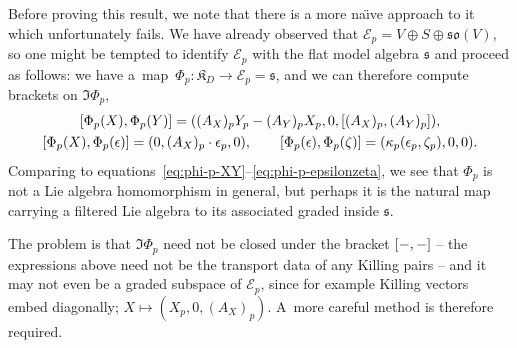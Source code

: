 \documentclass[11pt]{article}
\numberwithin{equation}{section}
\numberwithin{equation}{section}
\newcommand{\fs}{\mathfrak{s}}
\newcommand{\fso}{\mathfrak{so}}
\newcommand{\fK}{\mathfrak{K}}
\newcommand{\eE}{\mathscr{E}}
\newcommand{\1}{\mathbbm{1}}
\begin{document}
\begin{Remark}
Before proving this result, we note that there is a more na\"{\i}ve approach to it which unfortunately fails. We have already observed that $\eE_p = V\oplus S\oplus\fso(V)$, so one might be tempted to identify $\eE_p$ with the flat model algebra $\fs$ and proceed as follows: we have a~map~${\Phi_p\colon \fK_D\to \eE_p=\fs}$, and we can therefore compute brackets on $\Im\Phi_p$,
\begin{gather*}
	\comm{\Phi_p(X)}{\Phi_p(Y)}
		= \qty((A_X)_p Y_p - (A_Y)_p X_p,0,\comm{(A_X)_p}{(A_Y)_p}),\\
	\comm{\Phi_p(X)}{\Phi_p(\epsilon)}
		= \qty(0,(A_X)_p\cdot\epsilon_p,0),\qquad
	\comm{\Phi_p(\epsilon)}{\Phi_p(\zeta)}
		= \qty(\kappa_p(\epsilon_p,\zeta_p),0,0).
\end{gather*}
Comparing to equations~\eqref{eq:phi-p-XY}--\eqref{eq:phi-p-epsilonzeta}, we see that $\Phi_p$ is not a Lie algebra homomorphism in general, but perhaps it is the natural map carrying a filtered Lie algebra to its associated graded inside $\fs$.

The problem is that $\Im\Phi_p$ need not be closed under the bracket $\comm{-}{-}$ -- the expressions above need not be the transport data of any Killing pairs -- and it may not even be a graded subspace of $\eE_p$, since for example Killing vectors embed diagonally; $X\mapsto(X_p,0,(A_X)_p)$. A~more careful method is therefore required.
\end{Remark}
\end{document}
